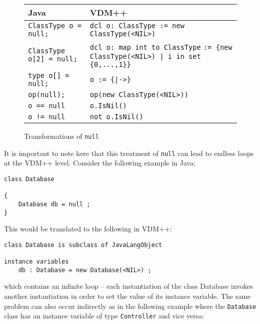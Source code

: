 \documentclass[\pformat,12pt]{article}
\newcommand{\JAVA}{Java}
\newcommand{\VDM}{VDM++}
\begin{document}
\begin{figure}[htbp]
  \begin{center}
\begin{longtable}{|l|p{7cm}|}
\hline
  \JAVA\   & \VDM\ \\ \hline \hline
  \texttt{ClassType o = null;}      & \texttt{dcl o: ClassType := new ClassType(<NIL>)}    \\ \hline
  \texttt{ClassType o[2] = {null};} & \texttt{dcl o: map int to ClassType}
                                      \texttt{:= \{new ClassType(<NIL>) | i in set \{0,...,1\}\}}    \\ \hline
  \texttt{type o[] = null;}         & \texttt{o := \{|->\}}    \\ \hline
  \texttt{op(null);}                & \texttt{op(new ClassType(<NIL>))}    \\ \hline
  \texttt{o == null}                & \texttt{o.IsNil()}    \\ \hline
  \texttt{o != null}                & \texttt{not o.IsNil()}    \\ \hline
\end{longtable}    
    \caption{Transformations of \texttt{null}}
    \label{fig:nullxfs}
  \end{center}
\end{figure}

It is important to note here that this treatment of \texttt{null} can
lead to endless loops at the VDM++ level. Consider the following
example in Java:

\begin{small}
\begin{verbatim}
class Database

{
    Database db = null ;
}
\end{verbatim}
\end{small}

This would be translated to the following in VDM++:

\begin{small}
\begin{verbatim}
class Database is subclass of JavaLangObject

instance variables
    db : Database = new Database(<NIL>) ;
\end{verbatim}
\end{small}

which contains an infinite loop -- each instantiation of the class
Database invokes another instantiation in order to set the value of
its instance variable. The same problem can also occur indirectly as
in the following example where the \texttt{Database} class has an
instance variable of type \texttt{Controller} and vice versa:
\end{document}

